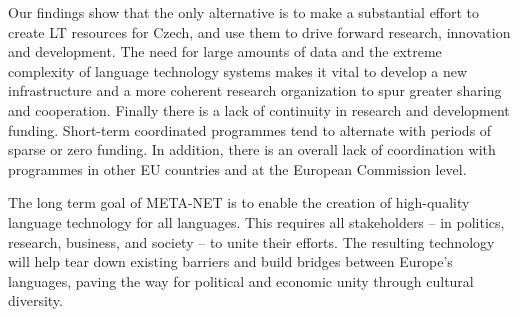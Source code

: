 \begin{multicols}{2}
Our findings show that the only alternative is to make a substantial effort to create LT resources for Czech, and use them to drive forward research, innovation and development. The need for large amounts of data and the extreme complexity of language technology systems makes it vital to develop a new infrastructure and a more coherent research organization to spur greater sharing and cooperation.
Finally there is a lack of continuity in research and development funding. Short-term coordinated programmes tend to alternate with periods of sparse or zero funding. In addition, there is an overall lack of coordination with programmes in other EU countries and at the European Commission level.

The long term goal of META-NET is to enable the creation of high-quality language technology for all languages. This requires all stakeholders -- in politics, research, business, and society -- to unite their efforts. The resulting technology will help tear down existing barriers and build bridges between Europe’s languages, paving the way for political and economic unity through cultural diversity.
\end{multicols}

\clearpage

